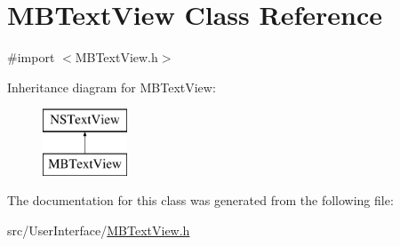 \hypertarget{interface_m_b_text_view}{\section{M\-B\-Text\-View Class Reference}
\label{interface_m_b_text_view}
}


{\ttfamily \#import $<$M\-B\-Text\-View.\-h$>$}

Inheritance diagram for M\-B\-Text\-View\-:\begin{figure}[H]
\begin{center}
\leavevmode
\includegraphics[height=2.000000cm]{interface_m_b_text_view}
\end{center}
\end{figure}


The documentation for this class was generated from the following file\-:\begin{DoxyCompactItemize}
\item 
src/\-User\-Interface/\hyperlink{_m_b_text_view_8h}{M\-B\-Text\-View.\-h}\end{DoxyCompactItemize}
